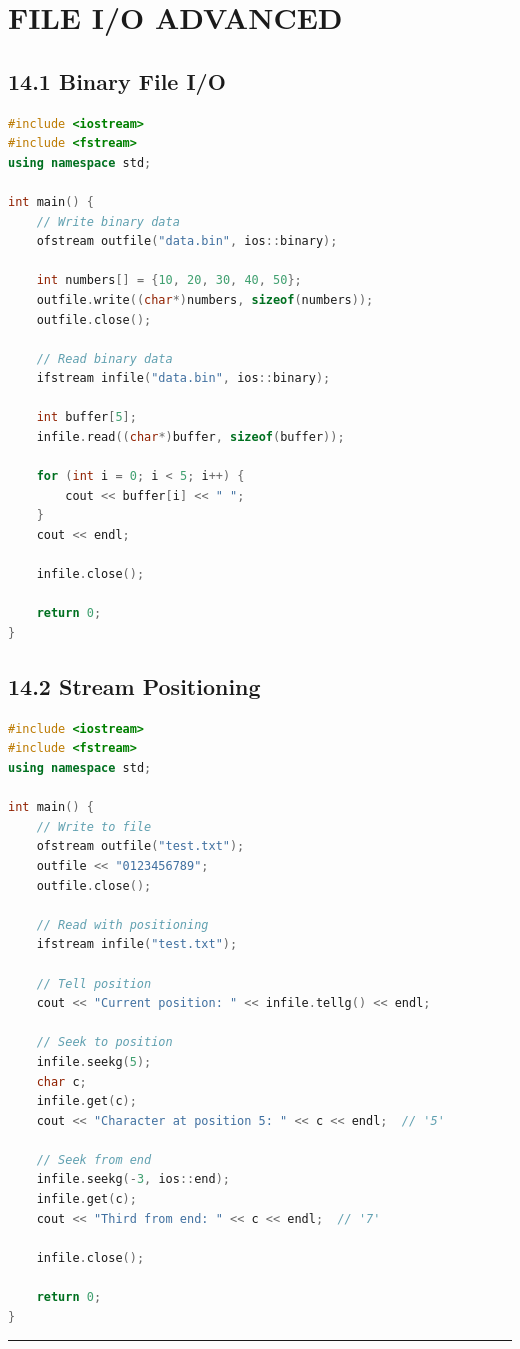 \hypertarget{file-io-advanced}{%
\chapter{FILE I/O ADVANCED}\label{file-io-advanced}}

\hypertarget{binary-file-io}{%
\section{14.1 Binary File I/O}\label{binary-file-io}}

\begin{lstlisting}[language={C++}]
#include <iostream>
#include <fstream>
using namespace std;

int main() {
    // Write binary data
    ofstream outfile("data.bin", ios::binary);
    
    int numbers[] = {10, 20, 30, 40, 50};
    outfile.write((char*)numbers, sizeof(numbers));
    outfile.close();
    
    // Read binary data
    ifstream infile("data.bin", ios::binary);
    
    int buffer[5];
    infile.read((char*)buffer, sizeof(buffer));
    
    for (int i = 0; i < 5; i++) {
        cout << buffer[i] << " ";
    }
    cout << endl;
    
    infile.close();
    
    return 0;
}
\end{lstlisting}

\hypertarget{stream-positioning}{%
\section{14.2 Stream Positioning}\label{stream-positioning}}

\begin{lstlisting}[language={C++}]
#include <iostream>
#include <fstream>
using namespace std;

int main() {
    // Write to file
    ofstream outfile("test.txt");
    outfile << "0123456789";
    outfile.close();
    
    // Read with positioning
    ifstream infile("test.txt");
    
    // Tell position
    cout << "Current position: " << infile.tellg() << endl;
    
    // Seek to position
    infile.seekg(5);
    char c;
    infile.get(c);
    cout << "Character at position 5: " << c << endl;  // '5'
    
    // Seek from end
    infile.seekg(-3, ios::end);
    infile.get(c);
    cout << "Third from end: " << c << endl;  // '7'
    
    infile.close();
    
    return 0;
}
\end{lstlisting}

\begin{center}\rule{0.5\linewidth}{0.5pt}\end{center}
